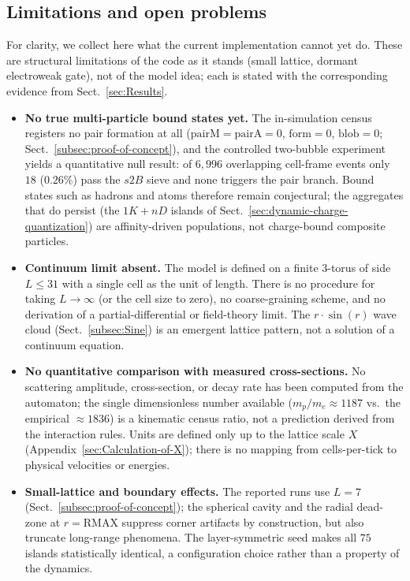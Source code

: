 \documentclass{ijuc}
\begin{document}
\subsection{Limitations and open problems}

For clarity, we collect here what the current implementation cannot yet do.  These are structural limitations of the code as it stands (small lattice, dormant electroweak gate), not of the model idea; each is stated with the corresponding evidence from Sect.~\ref{sec:Results}.

\begin{itemize}
  \item \textbf{No true multi-particle bound states yet.}  The in-simulation census registers no pair formation at all ($\mathrm{pairM}=\mathrm{pairA}=0$, $\mathrm{form}=0$, $\mathrm{blob}=0$; Sect.~\ref{subsec:proof-of-concept}), and the controlled two-bubble experiment yields a quantitative null result: of $6{,}996$ overlapping cell-frame events only $18$ ($0.26\%$) pass the $s2B$ sieve and none triggers the pair branch.  Bound states such as hadrons and atoms therefore remain conjectural; the aggregates that do persist (the $1K+nD$ islands of Sect.~\ref{sec:dynamic-charge-quantization}) are affinity-driven populations, not charge-bound composite particles.
  \item \textbf{Continuum limit absent.}  The model is defined on a finite $3$-torus of side $L\le31$ with a single cell as the unit of length.  There is no procedure for taking $L\to\infty$ (or the cell size to zero), no coarse-graining scheme, and no derivation of a partial-differential or field-theory limit.  The $r\cdot\sin(r)$ wave cloud (Sect.~\ref{subsec:Sine}) is an emergent lattice pattern, not a solution of a continuum equation.
  \item \textbf{No quantitative comparison with measured cross-sections.}  No scattering amplitude, cross-section, or decay rate has been computed from the automaton; the single dimensionless number available ($m_{p}/m_{e}\approx1187$ vs.~the empirical $\approx1836$) is a kinematic census ratio, not a prediction derived from the interaction rules.  Units are defined only up to the lattice scale $X$ (Appendix~\ref{sec:Calculation-of-X}); there is no mapping from cells-per-tick to physical velocities or energies.
  \item \textbf{Small-lattice and boundary effects.}  The reported runs use $L=7$ (Sect.~\ref{subsec:proof-of-concept}); the spherical cavity and the radial dead-zone at $r=\mathrm{RMAX}$ suppress corner artifacts by construction, but also truncate long-range phenomena.  The layer-symmetric seed makes all $75$ islands statistically identical, a configuration choice rather than a property of the dynamics.

\end{itemize}
\end{document}
